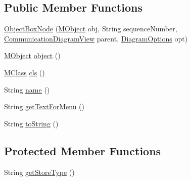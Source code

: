 \subsection*{Public Member Functions}
\begin{DoxyCompactItemize}
\item 
\hyperlink{classorg_1_1tzi_1_1use_1_1gui_1_1views_1_1diagrams_1_1behavior_1_1communicationdiagram_1_1_object_box_node_a15374943942c766c8b880e3c40a9afa7}{Object\-Box\-Node} (\hyperlink{interfaceorg_1_1tzi_1_1use_1_1uml_1_1sys_1_1_m_object}{M\-Object} obj, String sequence\-Number, \hyperlink{classorg_1_1tzi_1_1use_1_1gui_1_1views_1_1diagrams_1_1behavior_1_1communicationdiagram_1_1_communication_diagram_view}{Communication\-Diagram\-View} parent, \hyperlink{classorg_1_1tzi_1_1use_1_1gui_1_1views_1_1diagrams_1_1_diagram_options}{Diagram\-Options} opt)
\item 
\hyperlink{interfaceorg_1_1tzi_1_1use_1_1uml_1_1sys_1_1_m_object}{M\-Object} \hyperlink{classorg_1_1tzi_1_1use_1_1gui_1_1views_1_1diagrams_1_1behavior_1_1communicationdiagram_1_1_object_box_node_a51bf6c34e9961d73f2ef37aeb78bdfd7}{object} ()
\item 
\hyperlink{interfaceorg_1_1tzi_1_1use_1_1uml_1_1mm_1_1_m_class}{M\-Class} \hyperlink{classorg_1_1tzi_1_1use_1_1gui_1_1views_1_1diagrams_1_1behavior_1_1communicationdiagram_1_1_object_box_node_a3a6e3ce3b387bf2179bc54dd4a1e56fc}{cls} ()
\item 
String \hyperlink{classorg_1_1tzi_1_1use_1_1gui_1_1views_1_1diagrams_1_1behavior_1_1communicationdiagram_1_1_object_box_node_add5c9f7e82ee066f92d337dc57ed5b8a}{name} ()
\item 
String \hyperlink{classorg_1_1tzi_1_1use_1_1gui_1_1views_1_1diagrams_1_1behavior_1_1communicationdiagram_1_1_object_box_node_aa052ed283994623e56a8c3e8d8eea2c0}{get\-Text\-For\-Menu} ()
\item 
String \hyperlink{classorg_1_1tzi_1_1use_1_1gui_1_1views_1_1diagrams_1_1behavior_1_1communicationdiagram_1_1_object_box_node_a646779394fb582a1fe6608d0be5dcbd0}{to\-String} ()
\end{DoxyCompactItemize}
\subsection*{Protected Member Functions}
\begin{DoxyCompactItemize}
\item 
String \hyperlink{classorg_1_1tzi_1_1use_1_1gui_1_1views_1_1diagrams_1_1behavior_1_1communicationdiagram_1_1_object_box_node_ab3bd155aedfa97b00c3b2365f3584dc5}{get\-Store\-Type} ()
\end{DoxyCompactItemize}
